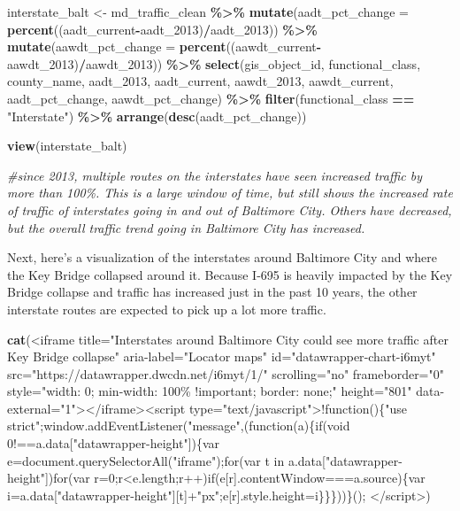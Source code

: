 \documentclass[
]{article}
\newenvironment{Shaded}{\begin{snugshade}}{\end{snugshade}}
\newcommand{\AttributeTok}[1]{\textcolor[rgb]{0.13,0.29,0.53}{#1}}
\newcommand{\CommentTok}[1]{\textcolor[rgb]{0.56,0.35,0.01}{\textit{#1}}}
\newcommand{\FunctionTok}[1]{\textcolor[rgb]{0.13,0.29,0.53}{\textbf{#1}}}
\newcommand{\NormalTok}[1]{#1}
\newcommand{\OtherTok}[1]{\textcolor[rgb]{0.56,0.35,0.01}{#1}}
\newcommand{\SpecialCharTok}[1]{\textcolor[rgb]{0.81,0.36,0.00}{\textbf{#1}}}
\newcommand{\StringTok}[1]{\textcolor[rgb]{0.31,0.60,0.02}{#1}}
\begin{document}
\begin{Shaded}
\begin{Highlighting}[]
\NormalTok{interstate\_balt }\OtherTok{\textless{}{-}}\NormalTok{ md\_traffic\_clean }\SpecialCharTok{\%\textgreater{}\%} 
  \FunctionTok{mutate}\NormalTok{(}\AttributeTok{aadt\_pct\_change =} \FunctionTok{percent}\NormalTok{((aadt\_current}\SpecialCharTok{{-}}\NormalTok{aadt\_2013)}\SpecialCharTok{/}\NormalTok{aadt\_2013)) }\SpecialCharTok{\%\textgreater{}\%} 
  \FunctionTok{mutate}\NormalTok{(}\AttributeTok{aawdt\_pct\_change =} \FunctionTok{percent}\NormalTok{((aawdt\_current}\SpecialCharTok{{-}}\NormalTok{aawdt\_2013)}\SpecialCharTok{/}\NormalTok{aawdt\_2013)) }\SpecialCharTok{\%\textgreater{}\%} 
  \FunctionTok{select}\NormalTok{(gis\_object\_id, functional\_class, county\_name, aadt\_2013, aadt\_current, aawdt\_2013, aawdt\_current, aadt\_pct\_change, aawdt\_pct\_change) }\SpecialCharTok{\%\textgreater{}\%} 
  \FunctionTok{filter}\NormalTok{(functional\_class }\SpecialCharTok{==} \StringTok{"Interstate"}\NormalTok{) }\SpecialCharTok{\%\textgreater{}\%} 
  \FunctionTok{arrange}\NormalTok{(}\FunctionTok{desc}\NormalTok{(aadt\_pct\_change))}

\FunctionTok{view}\NormalTok{(interstate\_balt)}

\CommentTok{\#since 2013, multiple routes on the interstates have seen increased traffic by more than 100\%. This is a large window of time, but still shows the increased rate of traffic of interstates going in and out of Baltimore City. Others have decreased, but the overall traffic trend going in Baltimore City has increased.}
\end{Highlighting}
\end{Shaded}

Next, here's a visualization of the interstates around Baltimore City
and where the Key Bridge collapsed around it. Because I-695 is heavily
impacted by the Key Bridge collapse and traffic has increased just in
the past 10 years, the other interstate routes are expected to pick up a
lot more traffic.

\begin{Shaded}
\begin{Highlighting}[]
\FunctionTok{cat}\NormalTok{(}\StringTok{\textquotesingle{}\textless{}iframe title="Interstates around Baltimore City could see more traffic after Key Bridge collapse" aria{-}label="Locator maps" id="datawrapper{-}chart{-}i6myt" src="https://datawrapper.dwcdn.net/i6myt/1/" scrolling="no" frameborder="0" style="width: 0; min{-}width: 100\% !important; border: none;" height="801" data{-}external="1"\textgreater{}\textless{}/iframe\textgreater{}\textless{}script type="text/javascript"\textgreater{}!function()\{"use strict";window.addEventListener("message",(function(a)\{if(void 0!==a.data["datawrapper{-}height"])\{var e=document.querySelectorAll("iframe");for(var t in a.data["datawrapper{-}height"])for(var r=0;r\textless{}e.length;r++)if(e[r].contentWindow===a.source)\{var i=a.data["datawrapper{-}height"][t]+"px";e[r].style.height=i\}\}\}))\}();}
\StringTok{\textless{}/script\textgreater{}\textquotesingle{}}\NormalTok{)}
\end{Highlighting}
\end{Shaded}
\end{document}
